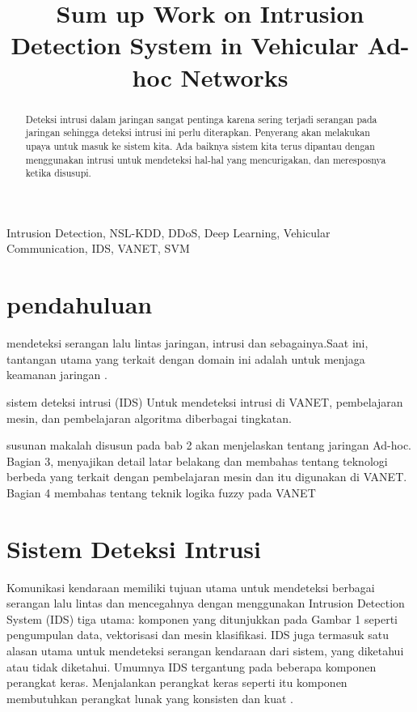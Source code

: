 \documentclass[conference]{IEEEtran}
\title{Sum up Work on Intrusion Detection System in Vehicular Ad-hoc Networks}
\author{\IEEEauthorblockN{Johanes Wilian Ang}
\IEEEauthorblockA{\textit{Fakultas Teknologi Informasi} \\
\textit{Institut Teknologi Batam}\\
Batam, Indonesia \\
email: johanwilian455@gmail.com}
}
\begin{document}
\maketitle
\begin{abstract}
    Deteksi intrusi dalam jaringan sangat pentinga karena sering terjadi serangan pada jaringan sehingga deteksi intrusi ini perlu diterapkan. Penyerang akan melakukan upaya untuk masuk ke sistem kita. Ada baiknya sistem kita terus dipantau dengan menggunakan intrusi untuk mendeteksi hal-hal yang mencurigakan, dan meresposnya ketika disusupi.
\end{abstract}

\begin{IEEEkeywords}
    Intrusion Detection, NSL-KDD, DDoS, Deep Learning, Vehicular Communication, IDS, VANET, SVM
\end{IEEEkeywords}

\section{pendahuluan}
    mendeteksi serangan lalu lintas jaringan, intrusi dan sebagainya.Saat ini, tantangan utama yang terkait dengan domain ini adalah untuk menjaga keamanan jaringan \cite {aydin2009hybrid}.
    
    sistem deteksi intrusi (IDS) Untuk mendeteksi intrusi di VANET, pembelajaran mesin, dan pembelajaran algoritma diberbagai tingkatan.
    
    susunan makalah disusun pada bab 2 akan menjelaskan tentang jaringan Ad-hoc. Bagian 3, menyajikan detail latar belakang dan membahas tentang teknologi berbeda yang terkait dengan pembelajaran mesin dan itu digunakan di VANET. Bagian 4 membahas tentang teknik logika fuzzy pada VANET

\section{Sistem Deteksi Intrusi}
    Komunikasi kendaraan memiliki tujuan utama untuk mendeteksi berbagai serangan lalu lintas dan mencegahnya dengan menggunakan Intrusion Detection System (IDS) tiga utama: komponen yang ditunjukkan pada Gambar 1 seperti pengumpulan data, vektorisasi dan mesin klasifikasi. IDS juga termasuk satu alasan utama untuk mendeteksi serangan kendaraan dari sistem, yang diketahui atau tidak diketahui. Umumnya IDS tergantung pada beberapa komponen perangkat keras. Menjalankan perangkat keras seperti itu komponen membutuhkan perangkat lunak yang konsisten dan kuat \cite {zhang2010research}.
\end{document}
